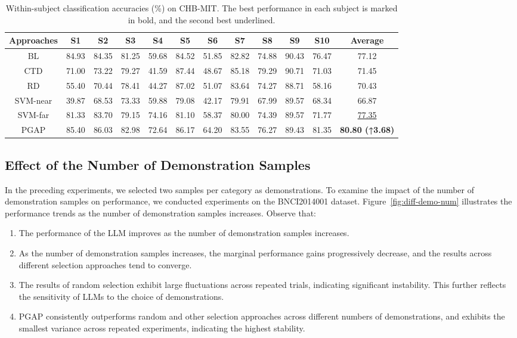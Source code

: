 \documentclass[journal,twocolumn]{IEEEtran}
\begin{document}
\begin{table}[htpb] \centering
  \caption{Within-subject classification accuracies (\%) on CHB-MIT. The best performance in each subject is marked in bold, and the second best underlined.}
  \label{tab:chb-mit-result}
  \begin{tabular}{c|c|c|c|c|c|c|c|c|c|c|c}
  \toprule
  Approaches & S1 & S2 & S3 & S4 & S5 & S6 & S7 & S8 & S9 & S10 & Average \\
  \midrule
  BL & 84.93 & 84.35 & 81.25 & 59.68 & 84.52 & 51.85 & 82.82 & 74.88 & 90.43 & 76.47 & 77.12 \\
  CTD & 71.00 & 73.22 & 79.27 & 41.59 & 87.44 & 48.67 & 85.18 & 79.29 & 90.71 & 71.03 & 71.45 \\
  RD & 55.40 & 70.44 & 78.41 & 44.27 & 87.02 & 51.07 & 83.64 & 74.27 & 88.71 & 58.16 & 70.43 \\
  SVM-near & 39.87 & 68.53 & 73.33 & 59.88 & 79.08 & 42.17 & 79.91 & 67.99 & 89.57 & 68.34 & 66.87 \\
  SVM-far & 81.33 & 83.70 & 79.15 & 74.16 & 81.10 & 58.37 & 80.00 & 74.39 & 89.57 & 71.77 & \underline{77.35} \\
  PGAP & 85.40 & 86.03 & 82.98 & 72.64 & 86.17 & 64.20 & 83.55 & 76.27 & 89.43 & 81.35 & \textbf{80.80 (↑3.68)} \\
  \bottomrule
  \end{tabular}
\end{table}

\subsection{Effect of the Number of Demonstration Samples}
In the preceding experiments, we selected two samples per category as demonstrations. To examine the impact of the number of demonstration samples on performance, we conducted experiments on the BNCI2014001 dataset. Figure~\ref{fig:diff-demo-num} illustrates the performance trends as the number of demonstration samples increases. Observe that:

\begin{enumerate}
  \item The performance of the LLM improves as the number of demonstration samples increases.
  \item As the number of demonstration samples increases, the marginal performance gains progressively decrease, and the results across different selection approaches tend to converge.
  \item The results of random selection exhibit large fluctuations across repeated trials, indicating significant instability. This further reflects the sensitivity of LLMs to the choice of demonstrations.
  \item PGAP consistently outperforms random and other selection approaches across different numbers of demonstrations, and exhibits the smallest variance across repeated experiments, indicating the highest stability.
\end{enumerate}
\end{document}

